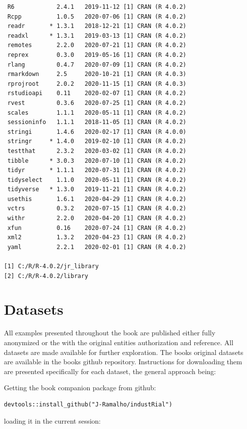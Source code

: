 \documentclass[
]{book}
\begin{document}
\begin{verbatim}
 R6            2.4.1   2019-11-12 [1] CRAN (R 4.0.2)
 Rcpp          1.0.5   2020-07-06 [1] CRAN (R 4.0.2)
 readr       * 1.3.1   2018-12-21 [1] CRAN (R 4.0.2)
 readxl      * 1.3.1   2019-03-13 [1] CRAN (R 4.0.2)
 remotes       2.2.0   2020-07-21 [1] CRAN (R 4.0.2)
 reprex        0.3.0   2019-05-16 [1] CRAN (R 4.0.2)
 rlang         0.4.7   2020-07-09 [1] CRAN (R 4.0.2)
 rmarkdown     2.5     2020-10-21 [1] CRAN (R 4.0.3)
 rprojroot     2.0.2   2020-11-15 [1] CRAN (R 4.0.3)
 rstudioapi    0.11    2020-02-07 [1] CRAN (R 4.0.2)
 rvest         0.3.6   2020-07-25 [1] CRAN (R 4.0.2)
 scales        1.1.1   2020-05-11 [1] CRAN (R 4.0.2)
 sessioninfo   1.1.1   2018-11-05 [1] CRAN (R 4.0.2)
 stringi       1.4.6   2020-02-17 [1] CRAN (R 4.0.0)
 stringr     * 1.4.0   2019-02-10 [1] CRAN (R 4.0.2)
 testthat      2.3.2   2020-03-02 [1] CRAN (R 4.0.2)
 tibble      * 3.0.3   2020-07-10 [1] CRAN (R 4.0.2)
 tidyr       * 1.1.1   2020-07-31 [1] CRAN (R 4.0.2)
 tidyselect    1.1.0   2020-05-11 [1] CRAN (R 4.0.2)
 tidyverse   * 1.3.0   2019-11-21 [1] CRAN (R 4.0.2)
 usethis       1.6.1   2020-04-29 [1] CRAN (R 4.0.2)
 vctrs         0.3.2   2020-07-15 [1] CRAN (R 4.0.2)
 withr         2.2.0   2020-04-20 [1] CRAN (R 4.0.2)
 xfun          0.16    2020-07-24 [1] CRAN (R 4.0.2)
 xml2          1.3.2   2020-04-23 [1] CRAN (R 4.0.2)
 yaml          2.2.1   2020-02-01 [1] CRAN (R 4.0.2)

[1] C:/R/R-4.0.2/jr_library
[2] C:/R/R-4.0.2/library
\end{verbatim}

\hypertarget{datasets}{%
\chapter{Datasets}\label{datasets}}

All examples presented throughout the book are published either fully anonymized or the with the original entities authorization and reference. All datasets are made available for further exploration. The books original datasets are available in the books github repository. Instructions for downloading them are presented specifically for each dataset, the general approach being:

Getting the book companion package from github:

\begin{verbatim}
devtools::install_github("J-Ramalho/industRial")
\end{verbatim}

loading it in the current session:
\end{document}
